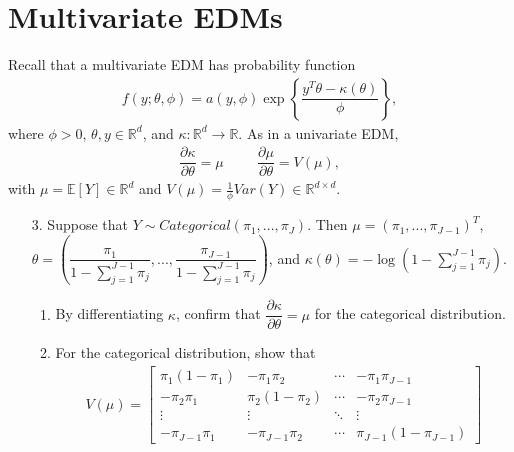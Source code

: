 \documentclass[11pt]{article}
\begin{document}
\begin{enumerate}
\begin{enumerate}
\end{enumerate}
\end{enumerate}

\vspace{0.5cm}

\section*{Multivariate EDMs}

Recall that a multivariate EDM has probability function
\begin{align*}
f(y; \theta, \phi) = a(y, \phi) \exp \left\lbrace \dfrac{y^T \theta - \kappa(\theta)}{\phi} \right\rbrace,
\end{align*}
where $\phi > 0$, $\theta, y \in \mathbb{R}^d$, and $\kappa: \mathbb{R}^d \to \mathbb{R}$. As in a univariate EDM,
\begin{align*}
\dfrac{\partial \kappa}{\partial \theta} = \mu \hspace{1cm} \dfrac{\partial \mu}{\partial \theta} = V(\mu),
\end{align*}
with $\mu = \mathbb{E}[Y] \in \mathbb{R}^d$ and $V(\mu) = \frac{1}{\phi} Var(Y) \in \mathbb{R}^{d \times d}$.

\begin{enumerate}
\item[3.] Suppose that $Y \sim Categorical(\pi_{1},...,\pi_{J})$. Then $\mu = (\pi_1,...,\pi_{J-1})^T$, $\theta = \left( \dfrac{\pi_1}{1 - \sum_{j=1}^{J-1} \pi_j}, ..., \dfrac{\pi_{J-1}}{1 - \sum_{j=1}^{J-1} \pi_j} \right)$, and $\kappa(\theta) = -\log\left(1 - \sum \limits_{j=1}^{J-1} \pi_j \right)$.

\begin{enumerate}
\item By differentiating $\kappa$, confirm that $\dfrac{\partial \kappa}{\partial \theta} = \mu$ for the categorical distribution.

\item For the categorical distribution, show that
\begin{align*}
V(\mu) = \begin{bmatrix}
\pi_1(1 - \pi_1) & -\pi_1 \pi_2 & \cdots & - \pi_1 \pi_{J-1} \\
-\pi_2 \pi_1 & \pi_2(1 - \pi_2) & \cdots & - \pi_2 \pi_{J-1} \\
\vdots & \vdots & \ddots & \vdots \\
-\pi_{J-1} \pi_1 &  -\pi_{J-1} \pi_2 & \cdots & \pi_{J-1}(1 - \pi_{J-1})
\end{bmatrix}
\end{align*}
\end{enumerate}
\end{enumerate}
\end{document}
